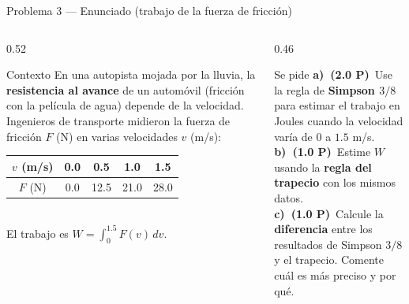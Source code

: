 \documentclass[aspectratio=169,10pt]{beamer}
\begin{document}
\begin{frame}{Problema 3 — Enunciado (trabajo de la fuerza de fricción)}
\begin{columns}[T]
\begin{column}{0.52\textwidth}
\begin{cardidea}{Contexto}{\faWater}
{\footnotesize En una autopista mojada por la lluvia, la \textbf{resistencia al avance} de un automóvil (fricción con la película de agua) depende de la velocidad. Ingenieros de transporte midieron la fuerza de fricción $F$ (N) en varias velocidades $v$ (m/s):}\\[0.8mm]
\centering
{\footnotesize\renewcommand{\arraystretch}{1.25}\setlength{\tabcolsep}{7pt}
\begin{tabular}{c|cccc}
$v$ (m/s) & 0.0 & 0.5 & 1.0 & 1.5\\\hline
$F$ (N) & 0.0 & 12.5 & 21.0 & 28.0\\
\end{tabular}}\\[0.8mm]
{\footnotesize El trabajo es $W=\displaystyle\int_0^{1.5}F(v)\,dv.$}
\end{cardidea}
\end{column}
\begin{column}{0.46\textwidth}
\begin{cardidea}{Se pide}{\faTasks}
{\footnotesize
\textbf{a)\ (2.0 P)}\ Use la regla de \textbf{Simpson $3/8$} para estimar el trabajo en Joules cuando la velocidad varía de $0$ a $1.5$ m/s.\\[1.4mm]
\textbf{b)\ (1.0 P)}\ Estime $W$ usando la \textbf{regla del trapecio} con los mismos datos.\\[1.4mm]
\textbf{c)\ (1.0 P)}\ Calcule la \textbf{diferencia} entre los resultados de Simpson $3/8$ y el trapecio. Comente cuál es más preciso y por qué.}
\end{cardidea}
\end{column}
\end{columns}
\end{frame}
\end{document}
